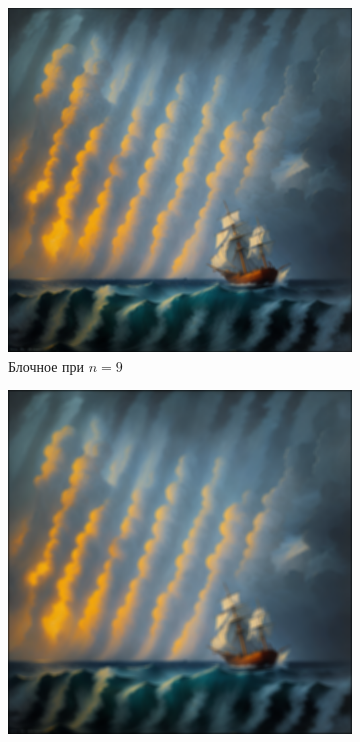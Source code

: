\documentclass[a4paper, 12pt]{article}
\begin{document}
    \begin{figure}[H]
        \centering
        \begin{subfigure}{0.30\textwidth}
            \centering
            \includegraphics[width=\linewidth]{bl_c2_n=9.png}
            \caption{Блочное при $n=9$}
            \label{fig:bl_c2_n=9}
        \end{subfigure}
        \begin{subfigure}{0.30\textwidth}
            \centering
            \includegraphics[width=\linewidth]{bl_c2_n=13.png}

\end{subfigure}
\end{figure}
\end{document}
